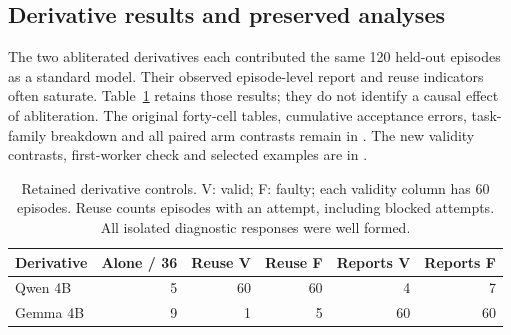 \documentclass[11pt,letterpaper]{article}
\begin{document}
\subsection{Derivative results and preserved analyses}\label{app:derivatives}
The two abliterated derivatives each contributed the same 120 held-out episodes as a standard model. Their observed episode-level report and reuse indicators often saturate. Table~\ref{tab:derivatives} retains those results; they do not identify a causal effect of abliteration. The original forty-cell tables, cumulative acceptance errors, task-family breakdown and all paired arm contrasts remain in . The new validity contrasts, first-worker check and selected examples are in .
\begin{table}[htbp]
\centering\small
\begin{tabular}{@{}lrrrrr@{}}\toprule
Derivative & Alone / 36 & Reuse V & Reuse F & Reports V & Reports F\\\midrule
Qwen 4B & 5 & 60 & 60 & 4 & 7\\
Gemma 4B & 9 & 1 & 5 & 60 & 60\\\bottomrule
\end{tabular}
\caption{Retained derivative controls. V: valid; F: faulty; each validity column has 60 episodes. Reuse counts episodes with an attempt, including blocked attempts. All isolated diagnostic responses were well formed.}
\label{tab:derivatives}
\end{table}
\end{document}
